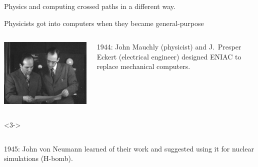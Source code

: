 \documentclass[aspectratio=169]{beamer}
\begin{document}
\begin{frame}{}
\LARGE
\vspace{1.25 cm}
\begin{center}
Physics and computing crossed paths in a different way.
\end{center}
\end{frame}

\begin{frame}{Physicists got into computers when they became general-purpose}
\vspace{0.5 cm}

\begin{columns}
\includegraphics[width=\linewidth]{presper-and-mauchly.jpg}

1944: John Mauchly (physicist) and J.\ Presper Eckert (electrical engineer) designed ENIAC to replace mechanical computers.

\vspace{0.25 cm}
\end{columns}

\vspace{0.25 cm}
\begin{uncoverenv}<3->
\begin{columns}
1945: John von Neumann learned of their work and suggested using it for nuclear simulations (H-bomb).

\vspace{0.25 cm}


\end{columns}
\end{uncoverenv}
\end{frame}
\end{document}

